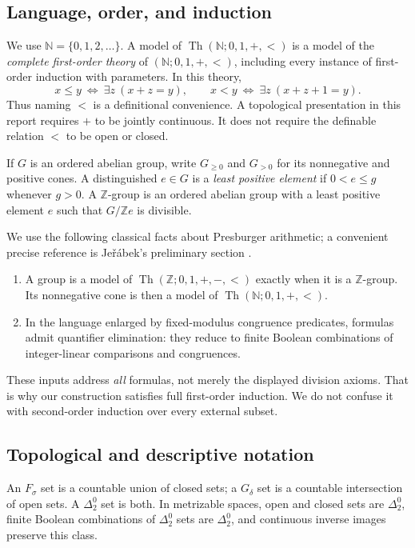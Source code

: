 \documentclass[11pt]{article}
\numberwithin{equation}{section}
\theoremstyle{definition}
\theoremstyle{remark}
\newcommand{\N}{\mathbb N}
\newcommand{\Z}{\mathbb Z}
\newcommand{\Th}{\operatorname{Th}}
\begin{document}
\subsection{Language, order, and induction}

We use $\N=\{0,1,2,\ldots\}$. A model of $\Th(\N;0,1,+,<)$ is a model of the
\emph{complete first-order theory} of $(\N;0,1,+,<)$, including every
instance of first-order induction with parameters. In this theory,
\begin{equation}
\label{pma:cp:eq:orderfromaddition}
x\leq y\ \Longleftrightarrow\ \exists z\ (x+z=y),\qquad
x<y\ \Longleftrightarrow\ \exists z\ (x+z+1=y).
\end{equation}
Thus naming $<$ is a definitional convenience. A topological presentation
in this report requires $+$ to be jointly continuous. It does not require
the definable relation $<$ to be open or closed.

If $G$ is an ordered abelian group, write $G_{\geq0}$ and $G_{>0}$ for
its nonnegative and positive cones. A distinguished $e\in G$ is a
\emph{least positive element} if $0<e\leq g$ whenever $g>0$.
A $\Z$-group is an ordered abelian group with a least positive element $e$
such that $G/\Z e$ is divisible.

We use the following classical facts about Presburger arithmetic; a
convenient precise reference is Je\v{r}\'abek's preliminary section
\cite{jerabek}.
\begin{enumerate}
\item A group is a model of $\operatorname{Th}(\Z;0,1,+,-,<)$ exactly when
it is a $\Z$-group. Its nonnegative cone is then a model of $\Th(\N;0,1,+,<)$.
\item In the language enlarged by fixed-modulus congruence predicates,
formulas admit quantifier elimination: they reduce to finite Boolean
combinations of integer-linear comparisons and congruences.
\end{enumerate}
These inputs address \emph{all} formulas, not merely the displayed division
axioms. That is why our construction satisfies full first-order induction.
We do not confuse it with second-order induction over every external subset.

\subsection{Topological and descriptive notation}

An $F_\sigma$ set is a countable union of closed sets; a $G_\delta$ set is
a countable intersection of open sets. A $\Delta^0_2$ set is both.
In metrizable spaces, open and closed sets are $\Delta^0_2$, finite Boolean
combinations of $\Delta^0_2$ sets are $\Delta^0_2$, and continuous inverse
images preserve this class.
\end{document}
